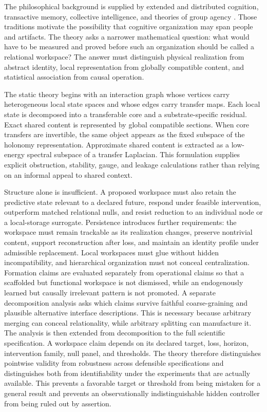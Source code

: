 \documentclass[11pt,letterpaper]{article}
\theoremstyle{plain}
\theoremstyle{definition}
\begin{document}
The philosophical background is supplied by extended and distributed cognition, transactive memory,
collective intelligence, and theories of group agency \cite{Hutchins1995,ClarkChalmers1998,Wegner1987,ListPettit2011}.
Those traditions motivate the possibility that cognitive organization may span people and artifacts.
The theory asks a narrower mathematical question: what would have to be measured and proved
before such an organization should be called a relational workspace? The answer must distinguish
physical realization from abstract identity, local representation from globally compatible content,
and statistical association from causal operation.

The static theory begins with an interaction graph whose vertices carry heterogeneous local state spaces
and whose edges carry transfer maps. Each local state is decomposed into a transferable core and a
substrate-specific residual. Exact shared content is represented by global compatible sections. When
core transfers are invertible, the same object appears as the fixed subspace of the holonomy representation.
Approximate shared content is extracted as a low-energy spectral subspace of a transfer Laplacian.
This formulation supplies explicit obstruction, stability, gauge, and leakage calculations rather than
relying on an informal appeal to shared context.

Structure alone is insufficient. A proposed workspace must also retain the predictive state relevant to
a declared future, respond under feasible intervention, outperform matched relational nulls, and resist
reduction to an individual node or a local-storage surrogate. Persistence introduces further requirements:
the workspace must remain trackable as its realization changes, preserve nontrivial content, support
reconstruction after loss, and maintain an identity profile under admissible replacement. Local workspaces
must glue without hidden incompatibility, and hierarchical organization must not conceal centralization.
Formation claims are evaluated separately from operational claims so that a scaffolded but functional
workspace is not dismissed, while an endogenously learned but causally irrelevant pattern is not promoted.
A separate decomposition analysis asks which claims survive faithful coarse-graining and plausible
alternative interface descriptions. This is necessary because arbitrary merging can conceal relationality,
while arbitrary splitting can manufacture it. The analysis is then extended from decomposition to the full
scientific specification. A workspace claim depends on its declared target, loss, horizon, intervention
family, null panel, and thresholds. The theory therefore distinguishes pointwise validity from robustness
across defensible specifications and distinguishes both from identifiability under the experiments that are
actually available. This prevents a favorable target or threshold from being mistaken for a general result
and prevents an observationally indistinguishable hidden controller from being ruled out by assertion.
\end{document}
